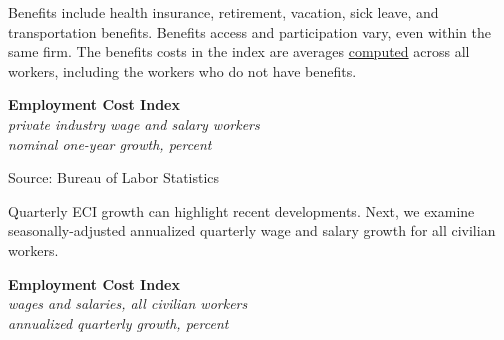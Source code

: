 \documentclass{report}
\makeatletter
\newcommand{\tbllink}[1]{\href{https://raw.githubusercontent.com/bdecon/US-chartbook/master/chartbook/data/#1}{\faTable}}
\newcommand*\short[1]{\expandafter\@gobbletwo\number\numexpr#1\relax}
\newcommand{\absnode}[3]{\node[below right, align=left] at (axis cs: #1,#2) {#3};}
\newcommand{\shdateaxisticks}{
		date coordinates in=x, axis line style={draw=none},
		xmax={2024-01-31},
		max space between ticks=40,	    
		xtick={{1990-01-01}, {1995-01-01}, {2000-01-01}, 
			{2005-01-01}, {2010-01-01}, {2015-01-01}, {2020-01-01}},
		minor xtick={},
		enlarge y limits={0.06}, enlarge x limits={0.01},
		xticklabel style={align=center, yshift=-2pt}, tick label style={inner sep=0pt},
		}
\newcommand{\bbar}[2]{extra #1 ticks = {{#2}}, extra #1 tick labels = ,
		extra #1 tick style = {grid=major, grid style={thick, black!25}},}
\newcommand{\stdline}[4]{\addplot[very thick, no markers, color=#1] 
		table [x=#2, y=#3, col sep=comma] {#4};	}
\newcommand{\rebars}{
		\fill[color=black!10] (axis cs:{2007-12-01},\pgfkeysvalueof{/pgfplots/ymin}) 
			rectangle (axis cs:{2009-07-01}, \pgfkeysvalueof{/pgfplots/ymax});
		\fill[color=black!10] (axis cs:{2001-03-01},\pgfkeysvalueof{/pgfplots/ymin}) 
			rectangle (axis cs:{2001-11-01}, \pgfkeysvalueof{/pgfplots/ymax});
		\fill[color=black!10] (axis cs:{2020-02-01},\pgfkeysvalueof{/pgfplots/ymin}) 
			rectangle (axis cs:{2020-05-01}, \pgfkeysvalueof{/pgfplots/ymax});}
\makeatother
\begin{document}
{\begin{minipage}{1.0\textwidth}
Benefits include health insurance, retirement, vacation, sick leave, and transportation benefits. Benefits access and participation vary, even within the same firm. The benefits costs in the index are averages \href{https://www.bls.gov/opub/mlr/cwc/benefit-cost-concepts-and-the-limitations-of-ecec-measurement.pdf}{computed} across all workers, including the workers who do not have benefits. 
\end{minipage}

\begin{minipage}{0.38\textwidth}
\normalsize \textbf{Employment Cost Index}\\
\footnotesize{\textit{private industry wage and salary workers}}\\
\footnotesize{\textit{nominal one-year growth, percent}}
\vspace{2.7cm}

\hspace{1mm} 

\footnotesize{Source: Bureau of Labor Statistics} \hfill \tbllink{eci.csv}
\end{minipage} \hspace{5mm} \begin{minipage}{0.335\textwidth}
\small 
\end{minipage}
\vspace{2mm}

\begin{minipage}{1.0\textwidth}
\small Quarterly ECI growth can highlight recent developments. Next, we examine seasonally-adjusted annualized quarterly wage and salary growth for all civilian workers.
\end{minipage}

\begin{minipage}{0.3\textwidth}
\small 
\end{minipage} \hspace{5mm} \begin{minipage}{0.415\textwidth}
\normalsize \textbf{Employment Cost Index}\\
\footnotesize{\textit{wages and salaries, all civilian workers}}\\
\footnotesize{\textit{annualized quarterly growth, percent}}
\vspace{2.4cm}


\end{minipage}}
\end{document}
